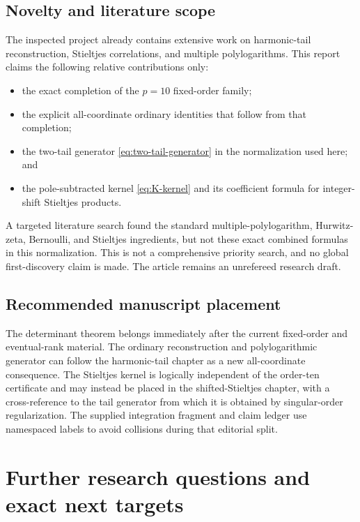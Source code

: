 \documentclass[11pt]{article}
\theoremstyle{definition}
\begin{document}
\subsection{Novelty and literature scope}

The inspected project already contains extensive work on harmonic-tail
reconstruction, Stieltjes correlations, and multiple polylogarithms.
This report claims the following relative contributions only:

\begin{itemize}
\item the exact completion of the $p=10$ fixed-order family;
\item the explicit all-coordinate ordinary identities that follow from
that completion;
\item the two-tail generator \eqref{eq:two-tail-generator} in the
normalization used here; and
\item the pole-subtracted kernel \eqref{eq:K-kernel} and its coefficient
formula for integer-shift Stieltjes products.
\end{itemize}

A targeted literature search found the standard multiple-polylogarithm,
Hurwitz-zeta, Bernoulli, and Stieltjes ingredients, but not these exact
combined formulas in this normalization.  This is not a comprehensive
priority search, and no global first-discovery claim is made.  The
article remains an unrefereed research draft.

\subsection{Recommended manuscript placement}

The determinant theorem belongs immediately after the current
fixed-order and eventual-rank material.  The ordinary reconstruction
and polylogarithmic generator can follow the harmonic-tail chapter as a
new all-coordinate consequence.  The Stieltjes kernel is logically
independent of the order-ten certificate and may instead be placed in
the shifted-Stieltjes chapter, with a cross-reference to the tail
generator from which it is obtained by singular-order regularization.
The supplied integration fragment and claim ledger use namespaced labels
to avoid collisions during that editorial split.
 \section{Further research questions and exact next targets}
\label{sec:research}
\end{document}
